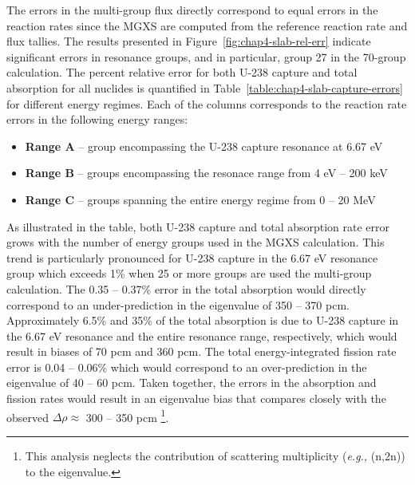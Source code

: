 The errors in the multi-group flux directly correspond to equal errors in the reaction rates since the \ac{MGXS} are computed from the reference reaction rate and flux tallies. The results presented in Figure~\ref{fig:chap4-slab-rel-err} indicate significant errors in resonance groups, and in particular, group 27 in the 70-group calculation. The percent relative error for both U-238 capture and total absorption for all nuclides is quantified in Table~\ref{table:chap4-slab-capture-errors} for different energy regimes. Each of the columns corresponds to the reaction rate errors in the following energy ranges:

\vspace{-0.1in}
\begin{itemize}[noitemsep]
  \item {\bf Range A} -- group encompassing the U-238 capture resonance at 6.67 eV
  \item {\bf Range B} -- groups encompassing the resonace range from 4 eV -- 200 keV
  \item {\bf Range C} -- groups spanning the entire energy regime from 0 -- 20 MeV
\end{itemize}
\vspace{-0.1in}

As illustrated in the table, both U-238 capture and total absorption rate error grows with the number of energy groups used in the \ac{MGXS} calculation. This trend is particularly pronounced for U-238 capture in the 6.67 eV resonance group which exceeds 1\% when 25 or more groups are used the multi-group calculation. The 0.35 -- 0.37\% error in the total absorption would directly correspond to an under-prediction in the eigenvalue of 350 -- 370 pcm. Approximately 6.5\% and 35\% of the total absorption is due to U-238 capture in the 6.67 eV resonance and the entire resonance range, respectively, which would result in biases of 70 pcm and 360 pcm. The total energy-integrated fission rate error is 0.04 -- 0.06\% which would correspond to an over-prediction in the eigenvalue of 40 -- 60 pcm. Taken together, the errors in the absorption and fission rates would result in an eigenvalue bias that compares closely with the observed $\Delta\rho \approx$ 300 -- 350 pcm \footnote{This analysis neglects the contribution of scattering multiplicity (\textit{e.g.,} (n,2n)) to the eigenvalue.}.

